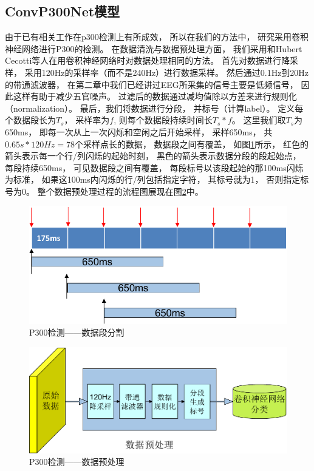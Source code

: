 \subsection{ConvP300Net模型}

由于已有相关工作在p300检测上有所成效， 所以在我们的方法中， 研究采用卷积神经网络进行P300的检测。 在数据清洗与数据预处理方面， 我们采用和Hubert Cecotti等人在用卷积神经网络时对数据处理相同的方法\cite{cecotti2011convolutional}。 首先对数据进行降采样， 采用120Hz的采样率（而不是240Hz）进行数据采样。 然后通过0.1Hz到20Hz的带通滤波器， 在第二章中我们已经讲过EEG所采集的信号主要是低频信号， 因此这样有助于减少五官噪声。 过滤后的数据通过减均值除以方差来进行规则化（normalization）。 最后，我们将数据进行分段， 并标号（计算label）。 定义每个数据段长为$T_s$， 采样率为$f$, 则每个数据段持续时间长$T_s*f$。 这里我们取$T_s$为650ms， 即每一次从上一次闪烁和空闲之后开始采样， 采样650ms， 共$0.65s*120Hz=78$个采样点长的数据， 数据段之间有覆盖， 如图\ref{fig:data_segmentation}所示， 红色的箭头表示每一个行/列闪烁的起始时刻， 黑色的箭头表示数据分段的段起始点， 每段持续650ms， 可见数据段之间有覆盖， 每段标号以该段起始的那100ms闪烁为标准， 如果这100ms内闪烁的行/列包括指定字符， 其标号就为1， 否则指定标号为0。 整个数据预处理过程的流程图展现在图\ref{fig:data_preprocess_flow}中。

\begin{figure}[htb]
  \centering
  \includegraphics[scale=0.9]{Pictures/CNN/data_segmentation-crop.pdf}
  \caption{P300检测——数据段分割}\label{fig:data_segmentation}
\end{figure}

\begin{figure}[htb]
  \centering
  \includegraphics[scale=0.8]{Pictures/CNN/cnn_flow-crop.pdf}
  \caption{P300检测——数据预处理}\label{fig:data_preprocess_flow}
\end{figure}



